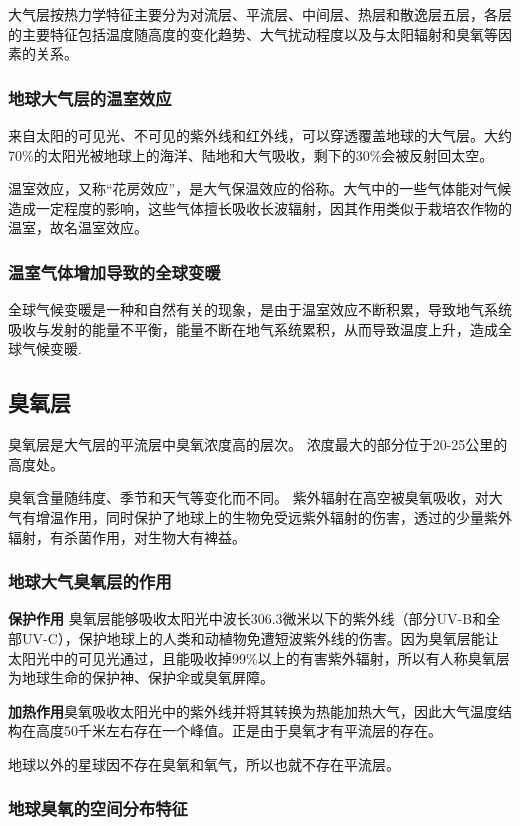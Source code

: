 \documentclass[12pt,a4paper]{article}
\begin{document}
	大气层按热力学特征主要分为对流层、平流层、中间层、热层和散逸层五层，各层的主要特征包括温度随高度的变化趋势、大气扰动程度以及与太阳辐射和臭氧等因素的关系。
	
	\subsubsection{地球大气层的温室效应}
	来自太阳的可见光、不可见的紫外线和红外线，可以穿透覆盖地球的大气层。大约70\%的太阳光被地球上的海洋、陆地和大气吸收，剩下的30\%会被反射回太空。
	
	温室效应，又称“花房效应”，是大气保温效应的俗称。大气中的一些气体能对气候造成一定程度的影响，这些气体擅长吸收长波辐射，因其作用类似于栽培农作物的温室，故名温室效应。
	\subsubsection{温室气体增加导致的全球变暖}
	全球气候变暖是一种和自然有关的现象，是由于温室效应不断积累，导致地气系统吸收与发射的能量不平衡，能量不断在地气系统累积，从而导致温度上升，造成全球气候变暖.
	\subsection{臭氧层}
	
	臭氧层是大气层的平流层中臭氧浓度高的层次。 浓度最大的部分位于20-25公里的高度处。
	
	臭氧含量随纬度、季节和天气等变化而不同。 紫外辐射在高空被臭氧吸收，对大气有增温作用，同时保护了地球上的生物免受远紫外辐射的伤害，透过的少量紫外辐射，有杀菌作用，对生物大有裨益。
	
	\subsubsection{地球大气臭氧层的作用}
	
	\textbf{保护作用} 臭氧层能够吸收太阳光中波长306.3微米以下的紫外线（部分UV-B和全部UV-C），保护地球上的人类和动植物免遭短波紫外线的伤害。因为臭氧层能让太阳光中的可见光通过，且能吸收掉99\%以上的有害紫外辐射，所以有人称臭氧层为地球生命的保护神、保护伞或臭氧屏障。
	
	\textbf{加热作用}臭氧吸收太阳光中的紫外线并将其转换为热能加热大气，因此大气温度结构在高度50千米左右存在一个峰值。正是由于臭氧才有平流层的存在。
	
	地球以外的星球因不存在臭氧和氧气，所以也就不存在平流层。
	
	\subsubsection{地球臭氧的空间分布特征}
	
\end{document}
